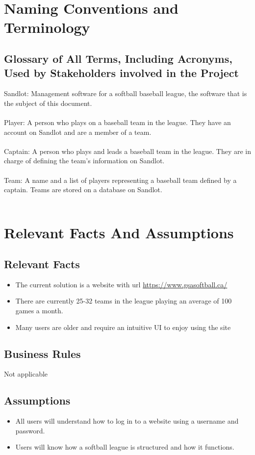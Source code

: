 \documentclass[12pt]{article}
\begin{document}
\section{Naming Conventions and Terminology}
\subsection{Glossary of All Terms, Including Acronyms, Used by Stakeholders
involved in the Project}
Sandlot: Management software for a softball baseball league, the software that
is the subject of this document.\\\\
Player: A person who plays on a baseball team in the league. They have an
account on Sandlot and are a member of a team.\\\\
Captain: A person who plays and leads a baseball team in the league. They are
in charge of defining the team's information on Sandlot.\\\\
Team: A name and a list of players representing a baseball team defined by a
captain. Teams are stored on a database on Sandlot.\\\\


\section{Relevant Facts And Assumptions}
\subsection{Relevant Facts}
\begin{itemize}
  \item The current solution is a website with url 
  \url{https://www.gsasoftball.ca/}
  \item There are currently 25-32 teams in the league playing an average of
  100 games a month.
  \item Many users are older and require an intuitive UI to enjoy using the
  site
\end{itemize}

\subsection{Business Rules}
Not applicable

\subsection{Assumptions}
\begin{itemize}
  \item All users will understand how to log in to a website using a username
  and password.
  \item Users will know how a softball league is structured and how it functions.
\end{itemize}
\end{document}

